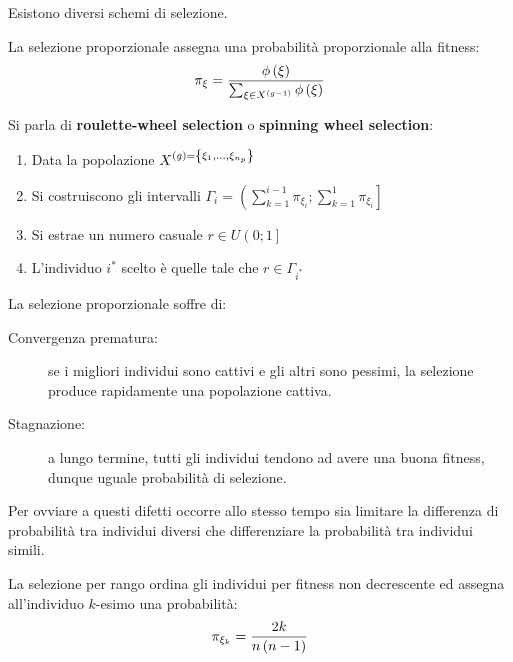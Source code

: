 \documentclass[\main/main.tex]{subfiles}
\begin{document}
\begin{multicols}{2}
\begin{definition}[Selezione]
    Esistono diversi schemi di selezione.
\end{definition}
\begin{definition}
    La selezione proporzionale assegna una probabilità proporzionale alla fitness:
    \[
        \pi_{\xi} = \frac{\phi\left(\xi\right)}{\sum_{\xi\in X^{\left(g-1\right)}} \phi\left(\xi\right)}
    \]    
\end{definition}
\begin{definition}
Si parla di \textbf{roulette-wheel selection} o \textbf{spinning wheel selection}:
\begin{enumerate}
    \item Data la popolazione \(X^{\left(g\right)=\left\{\xi_1, \ldots, \xi_{n_p}\right\}}\)
    \item Si costruiscono gli intervalli \(\Gamma_i = \left(\sum_{k=1}^{i-1} \pi_{\xi_i}; \sum_{k=1}^{1} \pi_{\xi_i}\right]\)
    \item Si estrae un numero casuale \(r \in U\left(0;1\right]\)
    \item L'individuo \(i^*\) scelto è quelle tale che \(r \in \Gamma_{i^*}\)
\end{enumerate}
\end{definition}
\begin{observation}
    La selezione proporzionale soffre di:
    \begin{description}
        \item[Convergenza prematura:] se i migliori individui sono cattivi e gli altri sono pessimi, la selezione produce rapidamente una popolazione cattiva.
        \item[Stagnazione:] a lungo termine, tutti gli individui tendono ad avere una buona fitness, dunque uguale probabilità di selezione.
    \end{description}
    Per ovviare a questi difetti occorre allo stesso tempo sia limitare la differenza di probabilità tra individui diversi che differenziare la probabilità tra individui simili.
\end{observation}
\begin{definition}
    La selezione per rango ordina gli individui per fitness non decrescente ed assegna all'individuo \(k\)-esimo una probabilità:
    \[
        \pi_{\xi_k} = \frac{2k}{n\left(n-1\right)}
    \]    
\end{definition}
\begin{observation}

\end{observation}
\end{multicols}
\end{document}
